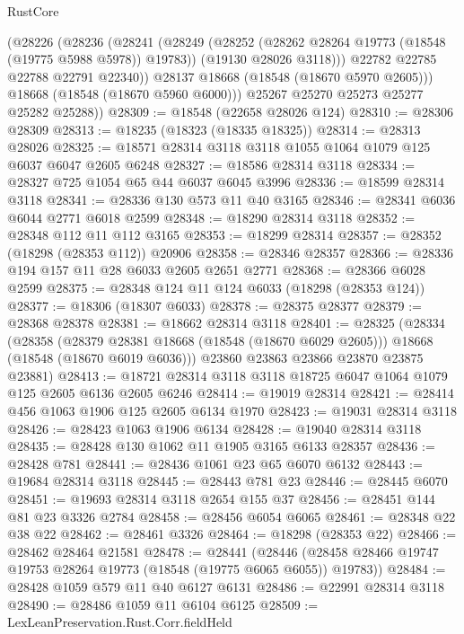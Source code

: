 \begin{lexlean}{RustCore}
\begin{coremodule}
            (@28226
              (@28236
                (@28241
                  (@28249
                    (@28252 (@28262 @28264 @19773 (@18548 (@19775 @5988 @5978)) @19783))
                    (@19130 @28026 @3118)))
                @22782
                @22785
                @22788
                @22791
                @22340))
            @28137
            @18668
            (@18548 (@18670 @5970 @2605)))
          @18668
          (@18548 (@18670 @5960 @6000)))
        @25267
        @25270
        @25273
        @25277
        @25282
        @25288))
@28309 := @18548 (@22658 @28026 @124)
@28310 := @28306 @28309
@28313 := @18235 (@18323 (@18335 @18325))
@28314 := @28313 @28026
@28325 := @18571 @28314 @3118 @3118 @1055 @1064 @1079 @125 @6037 @6047 @2605 @6248
@28327 := @18586 @28314 @3118
@28334 := @28327 @725 @1054 @65 @44 @6037 @6045 @3996
@28336 := @18599 @28314 @3118
@28341 := @28336 @130 @573 @11 @40 @3165
@28346 := @28341 @6036 @6044 @2771 @6018 @2599
@28348 := @18290 @28314 @3118
@28352 := @28348 @112 @11 @112 @3165
@28353 := @18299 @28314
@28357 := @28352 (@18298 (@28353 @112)) @20906
@28358 := @28346 @28357
@28366 := @28336 @194 @157 @11 @28 @6033 @2605 @2651 @2771
@28368 := @28366 @6028 @2599
@28375 := @28348 @124 @11 @124 @6033 (@18298 (@28353 @124))
@28377 := @18306 (@18307 @6033)
@28378 := @28375 @28377
@28379 := @28368 @28378
@28381 := @18662 @28314 @3118
@28401 := @28325
    (@28334
      (@28358
        (@28379 @28381 @18668 (@18548 (@18670 @6029 @2605)))
        @18668
        (@18548 (@18670 @6019 @6036)))
      @23860
      @23863
      @23866
      @23870
      @23875
      @23881)
@28413 := @18721 @28314 @3118 @3118 @18725 @6047 @1064 @1079 @125 @2605 @6136 @2605 @6246
@28414 := @19019 @28314
@28421 := @28414 @456 @1063 @1906 @125 @2605 @6134 @1970
@28423 := @19031 @28314 @3118
@28426 := @28423 @1063 @1906 @6134
@28428 := @19040 @28314 @3118
@28435 := @28428 @130 @1062 @11 @1905 @3165 @6133 @28357
@28436 := @28428 @781
@28441 := @28436 @1061 @23 @65 @6070 @6132
@28443 := @19684 @28314 @3118
@28445 := @28443 @781 @23
@28446 := @28445 @6070
@28451 := @19693 @28314 @3118 @2654 @155 @37
@28456 := @28451 @144 @81 @23 @3326 @2784
@28458 := @28456 @6054 @6065
@28461 := @28348 @22 @38 @22
@28462 := @28461 @3326
@28464 := @18298 (@28353 @22)
@28466 := @28462 @28464 @21581
@28478 := @28441
    (@28446 (@28458 @28466 @19747 @19753 @28264 @19773 (@18548 (@19775 @6065 @6055)) @19783))
@28484 := @28428 @1059 @579 @11 @40 @6127 @6131
@28486 := @22991 @28314 @3118
@28490 := @28486 @1059 @11 @6104 @6125
@28509 := LexLeanPreservation.Rust.Corr.fieldHeld

\end{coremodule}
\end{lexlean}
